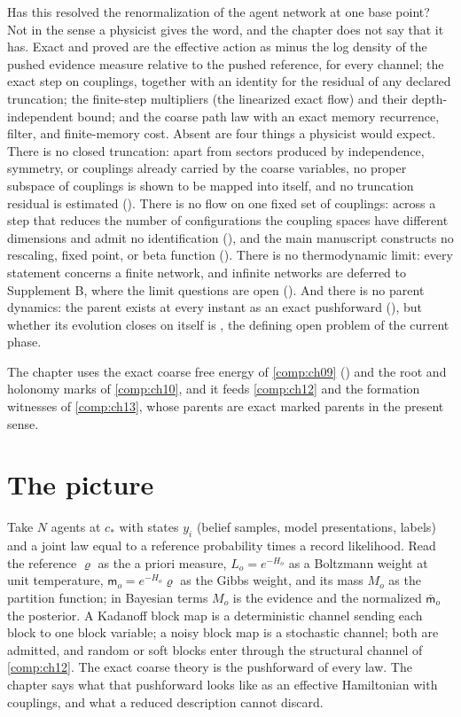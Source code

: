 Has this resolved the renormalization of the agent network at one base point? Not in the sense a
physicist gives the word, and the chapter does not say that it has. Exact and proved are the
effective action as minus the log density of the pushed evidence measure relative to the pushed
reference, for every channel; the
exact step on couplings, together with an identity for the residual of any declared truncation; the
finite-step multipliers (the linearized exact flow) and their depth-independent bound; and the
coarse path law with an exact memory recurrence, filter, and finite-memory cost. Absent are four
things a physicist would expect. There is no closed truncation: apart from sectors produced by
independence, symmetry, or couplings already carried by the coarse variables, no proper subspace of
couplings is shown to be mapped into itself, and no truncation residual is estimated
(). There is no flow on one fixed set of couplings: across a
step that reduces the number of configurations the coupling spaces have different dimensions and
admit no identification (), and the main
manuscript constructs no rescaling, fixed point, or beta function ().
There is no thermodynamic limit: every statement concerns a finite network, and infinite networks
are deferred to Supplement B, where the limit questions are open ().
And there is no parent dynamics: the parent exists at every instant as an exact pushforward
(), but whether its evolution closes on itself is
, the defining open problem of the current phase.

The chapter uses the exact coarse free energy of \cref{comp:ch09} () and
the root and holonomy marks of \cref{comp:ch10}, and it feeds \cref{comp:ch12} and the formation
witnesses of \cref{comp:ch13}, whose parents are exact marked parents in the present sense.

\section{The picture}
\label{comp:ch11-picture}

Take $N$ agents at $c_*$ with states $y_i$ (belief samples, model presentations, labels) and a joint
law equal to a reference probability times a record likelihood. Read the reference $\varrho$ as the a
priori measure, $L_o=e^{-H_o}$ as a Boltzmann weight at unit temperature, $\mathsf m_o=e^{-H_o}\varrho$
as the Gibbs weight, and its mass $M_o$ as the partition function; in Bayesian terms $M_o$ is the
evidence and the normalized $\bar{\mathsf m}_o$ the posterior. A Kadanoff block map is a
deterministic channel sending each block to one block variable; a noisy block map is a stochastic
channel; both are admitted, and random or soft blocks enter through the structural channel of
\cref{comp:ch12}. The exact coarse theory is the pushforward of every law. The chapter says what
that pushforward looks like as an effective Hamiltonian with couplings, and what a reduced
description cannot discard.

